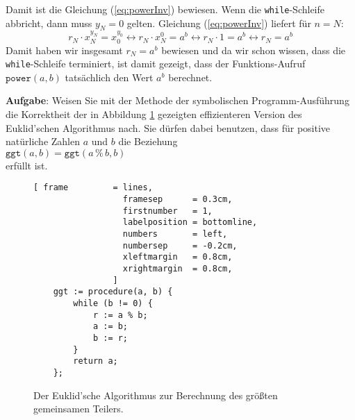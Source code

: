 Damit ist die Gleichung (\ref{eq:powerInv}) bewiesen.   Wenn die \texttt{while}-Schleife
abbricht, dann muss $y_N = 0$ gelten.  Gleichung (\ref{eq:powerInv}) liefert f\"ur $n=N$:
\[ r_N \cdot x_N^{y_N} = x_0^{y_0} 
  \leftrightarrow  r_N \cdot x_N^{0}   = a^b
  \leftrightarrow  r_N \cdot 1         = a^b
  \leftrightarrow  r_N                 = a^b
\]
Damit haben wir insgesamt $r_N = a^b$ bewiesen und da wir schon wissen, dass
die \texttt{while}-Schleife terminiert, ist damit gezeigt, dass der
Funktions-Aufruf $\texttt{power}(a,b)$ tats\"achlich den Wert $a^b$ berechnet.
\vspace*{0.3cm}
\pagebreak

\noindent
\textbf{Aufgabe}:  Weisen Sie mit der Methode der symbolischen Programm-Ausf\"uhrung die
Korrektheit der in Abbildung \ref{fig:gcd.c} gezeigten effizienteren Version des
Euklid'schen Algorithmus nach. 
Sie d\"urfen dabei benutzen, dass f\"ur positive nat\"urliche Zahlen $a$ und $b$ die Beziehung 
\\[0.2cm]
\hspace*{1.3cm}
$\mathtt{ggt}(a, b) = \mathtt{ggt}(a \,\texttt{\%}\, b, b)$
\\[0.2cm]
erf\"ullt ist.  

\begin{figure}[!ht]
\centering
\begin{Verbatim}[ frame         = lines, 
                  framesep      = 0.3cm, 
                  firstnumber   = 1,
                  labelposition = bottomline,
                  numbers       = left,
                  numbersep     = -0.2cm,
                  xleftmargin   = 0.8cm,
                  xrightmargin  = 0.8cm,
                ]
    ggt := procedure(a, b) {
        while (b != 0) {
            r := a % b;
            a := b;
            b := r;
        }
        return a;
    };
\end{Verbatim}
\vspace*{-0.3cm}
\caption{Der Euklid'sche Algorithmus zur Berechnung des gr\"o{\ss}ten gemeinsamen Teilers.}
\label{fig:gcd.c}
\end{figure}


